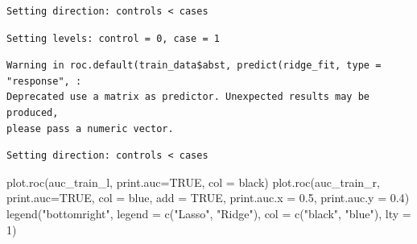 \documentclass[
  letterpaper,
  DIV=11,
  numbers=noendperiod]{scrartcl}
\newenvironment{Shaded}{\begin{snugshade}}{\end{snugshade}}
\newcommand{\AttributeTok}[1]{\textcolor[rgb]{0.40,0.45,0.13}{#1}}
\newcommand{\ConstantTok}[1]{\textcolor[rgb]{0.56,0.35,0.01}{#1}}
\newcommand{\DecValTok}[1]{\textcolor[rgb]{0.68,0.00,0.00}{#1}}
\newcommand{\FloatTok}[1]{\textcolor[rgb]{0.68,0.00,0.00}{#1}}
\newcommand{\FunctionTok}[1]{\textcolor[rgb]{0.28,0.35,0.67}{#1}}
\newcommand{\NormalTok}[1]{\textcolor[rgb]{0.00,0.23,0.31}{#1}}
\newcommand{\OtherTok}[1]{\textcolor[rgb]{0.00,0.23,0.31}{#1}}
\newcommand{\SpecialCharTok}[1]{\textcolor[rgb]{0.37,0.37,0.37}{#1}}
\newcommand{\StringTok}[1]{\textcolor[rgb]{0.13,0.47,0.30}{#1}}
\begin{document}
\begin{verbatim}
Setting direction: controls < cases
\end{verbatim}

\begin{Shaded}
\end{Shaded}

\begin{verbatim}
Setting levels: control = 0, case = 1
\end{verbatim}

\begin{verbatim}
Warning in roc.default(train_data$abst, predict(ridge_fit, type = "response", :
Deprecated use a matrix as predictor. Unexpected results may be produced,
please pass a numeric vector.
\end{verbatim}

\begin{verbatim}
Setting direction: controls < cases
\end{verbatim}

\begin{Shaded}
\begin{Highlighting}[]
\FunctionTok{plot.roc}\NormalTok{(auc\_train\_l, }\AttributeTok{print.auc=}\ConstantTok{TRUE}\NormalTok{, }\AttributeTok{col =} \StringTok{\textquotesingle{}black\textquotesingle{}}\NormalTok{)}
\FunctionTok{plot.roc}\NormalTok{(auc\_train\_r, }\AttributeTok{print.auc=}\ConstantTok{TRUE}\NormalTok{, }\AttributeTok{col =} \StringTok{\textquotesingle{}blue\textquotesingle{}}\NormalTok{, }\AttributeTok{add =} \ConstantTok{TRUE}\NormalTok{, }\AttributeTok{print.auc.x =} \FloatTok{0.5}\NormalTok{, }\AttributeTok{print.auc.y =} \FloatTok{0.4}\NormalTok{)}
\FunctionTok{legend}\NormalTok{(}\StringTok{"bottomright"}\NormalTok{, }\AttributeTok{legend =} \FunctionTok{c}\NormalTok{(}\StringTok{"Lasso"}\NormalTok{, }\StringTok{"Ridge"}\NormalTok{), }\AttributeTok{col =} \FunctionTok{c}\NormalTok{(}\StringTok{"black"}\NormalTok{, }\StringTok{"blue"}\NormalTok{), }\AttributeTok{lty =} \DecValTok{1}\NormalTok{)}
\end{Highlighting}
\end{Shaded}
\end{document}

